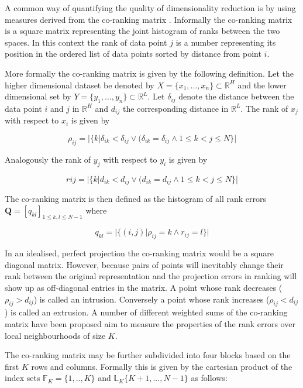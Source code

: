 A common way of quantifying the quality of dimensionality reduction is by using measures derived from the co-ranking matrix \cite{lee2009quality}. Informally the co-ranking matrix is a square matrix representing the joint histogram of ranks between the two spaces. In this context the rank of data point $j$ is a number representing its position in the ordered list of data points sorted by distance from point $i$.

More formally the co-ranking matrix is given by the following definition. Let the higher dimensional dataset be denoted by $X = \{x_1, ..., x_n\} \subset \mathbb{R}^H$ and the lower dimensional set by $Y = \{y_1, ..., y_n\} \subset \mathbb{R}^L$. Let $\delta_{ij}$ denote the distance between the data point $i$ and $j$ in $\mathbb{R}^H$ and $d_{ij}$ the corresponding distance in $\mathbb{R}^L$. The rank of $x_j$ with respect to $x_i$ is given by

\begin{equation}
	\rho_{ij} = |\{k | \delta_{ik} < \delta_{ij} \lor (\delta_{ik} = \delta_{ij} \land 1 \leq k < j \leq N\}|
\end{equation}

Analogously the rank of $y_j$ with respect to $y_i$ is given by

\begin{equation}
	r{ij} = |\{k | d_{ik} < d_{ij} \lor (d_{ik} = d_{ij} \land 1 \leq k < j \leq N\}|
\end{equation}

The co-ranking matrix is then defined as the histogram of all rank errors $\bm{Q} = [q_{kl}]_{1 \leq k, l \leq N-1}$ where

\begin{equation}
	q_{kl} = |\{(i,j) | \rho_{ij} = k \land r_{ij} = l\}|
\end{equation}

In an idealised, perfect projection the co-ranking matrix would be a square diagonal matrix. However, because pairs of points will inevitably change their rank between the original representation and the projection errors in ranking will show up as off-diagonal entries in the matrix. A point whose rank decreases ($\rho_{ij} > d_{ij}$)  is called an intrusion. Conversely a point whose rank increases ($\rho_{ij} < d_{ij}$) is called an extrusion. A number of different weighted sums of the co-ranking matrix have been proposed aim to measure the properties of the rank errors over local neighbourhoods of size $K$.

The co-ranking matrix may be further subdivided into four blocks based on the first $K$ rows and columns. Formally this is given by the cartesian product of the index sets $\mathbb{F}_K = \{1, .., K\}$ and $\mathbb{L}_K \{K+1, ..., N-1\}$ as follows:

